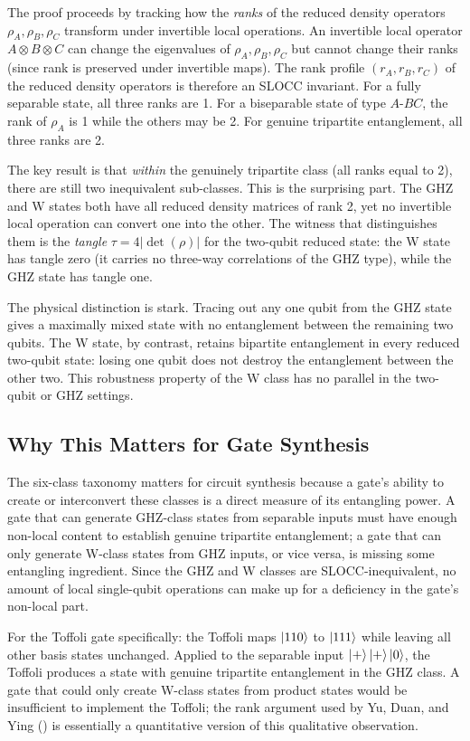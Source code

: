 \documentclass[12pt, a4paper, oneside]{report}
\theoremstyle{plain}
\theoremstyle{definition}
\theoremstyle{remark}
\begin{document}
The proof proceeds by tracking how the \emph{ranks} of the reduced density operators
$\rho_A, \rho_B, \rho_C$ transform under invertible local operations. An invertible local
operator $A \otimes B \otimes C$ can change the eigenvalues of $\rho_A, \rho_B, \rho_C$
but cannot change their ranks (since rank is preserved under invertible maps). The rank
profile $(r_A, r_B, r_C)$ of the reduced density operators is therefore an SLOCC invariant.
For a fully separable state, all three ranks are 1. For a biseparable state of type $A$-$BC$,
the rank of $\rho_A$ is 1 while the others may be 2. For genuine tripartite entanglement,
all three ranks are 2.

The key result is that \emph{within} the genuinely tripartite class (all ranks equal to 2),
there are still two inequivalent sub-classes. This is the surprising part. The GHZ and W
states both have all reduced density matrices of rank 2, yet no invertible local operation
can convert one into the other. The witness that distinguishes them is the \emph{tangle}
$\tau = 4|\det(\rho)|$ for the two-qubit reduced state: the W state has tangle zero (it
carries no three-way correlations of the GHZ type), while the GHZ state has tangle one.

The physical distinction is stark. Tracing out any one qubit from the GHZ state gives a
maximally mixed state with no entanglement between the remaining two qubits. The W state,
by contrast, retains bipartite entanglement in every reduced two-qubit state: losing one
qubit does not destroy the entanglement between the other two. This robustness property of
the W class has no parallel in the two-qubit or GHZ settings.

\subsection{Why This Matters for Gate Synthesis}

The six-class taxonomy matters for circuit synthesis because a gate's ability to create or
interconvert these classes is a direct measure of its entangling power. A gate that can
generate GHZ-class states from separable inputs must have enough non-local content to
establish genuine tripartite entanglement; a gate that can only generate W-class states from
GHZ inputs, or vice versa, is missing some entangling ingredient. Since the GHZ and W classes
are SLOCC-inequivalent, no amount of local single-qubit operations can make up for a
deficiency in the gate's non-local part.

For the Toffoli gate specifically: the Toffoli maps $\ket{110}$ to $\ket{111}$ while leaving
all other basis states unchanged. Applied to the separable input
$\ket{+}\ket{+}\ket{0}$, the Toffoli produces a state with genuine tripartite entanglement
in the GHZ class. A gate that could only create W-class states from product states would be
insufficient to implement the Toffoli; the rank argument used by Yu, Duan, and Ying
() is essentially a quantitative version of this qualitative observation.
\end{document}
